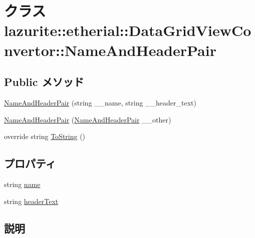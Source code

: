 \hypertarget{classlazurite_1_1etherial_1_1_data_grid_view_convertor_1_1_name_and_header_pair}{
\section{クラス lazurite::etherial::DataGridViewConvertor::NameAndHeaderPair}
\label{classlazurite_1_1etherial_1_1_data_grid_view_convertor_1_1_name_and_header_pair}
}
\subsection*{Public メソッド}
\begin{DoxyCompactItemize}
\item 
\hyperlink{classlazurite_1_1etherial_1_1_data_grid_view_convertor_1_1_name_and_header_pair_aacdb6a47137572482f93a592338bf27f}{NameAndHeaderPair} (string \_\-\_\-name, string \_\-\_\-header\_\-text)
\item 
\hyperlink{classlazurite_1_1etherial_1_1_data_grid_view_convertor_1_1_name_and_header_pair_aa2f7f9f8f6c2a09127e9cf33ca1dcaa5}{NameAndHeaderPair} (\hyperlink{classlazurite_1_1etherial_1_1_data_grid_view_convertor_1_1_name_and_header_pair}{NameAndHeaderPair} \_\-\_\-other)
\item 
override string \hyperlink{classlazurite_1_1etherial_1_1_data_grid_view_convertor_1_1_name_and_header_pair_a09da40d12bb28301b6f183a9879e3773}{ToString} ()
\end{DoxyCompactItemize}
\subsection*{プロパティ}
\begin{DoxyCompactItemize}
\item 
string \hyperlink{classlazurite_1_1etherial_1_1_data_grid_view_convertor_1_1_name_and_header_pair_a39392fc89bef948ec3bdf1e371b0716e}{name}
\item 
string \hyperlink{classlazurite_1_1etherial_1_1_data_grid_view_convertor_1_1_name_and_header_pair_af2a92bbbc8da59d41c5583ebd2bbacd9}{headerText}
\end{DoxyCompactItemize}


\subsection{説明}


